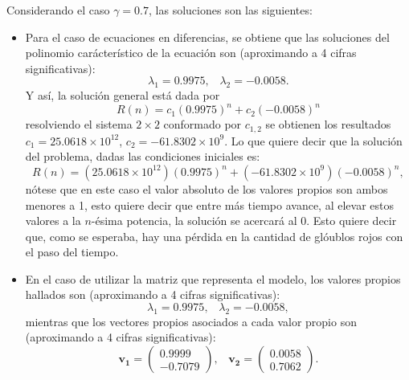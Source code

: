 Considerando el caso $\gamma = 0.7$, las soluciones son las siguientes:
\begin{itemize}
    \item Para el caso de ecuaciones en diferencias, se obtiene que las soluciones del polinomio carácterístico de la ecuación son (aproximando a 4 cifras significativas):
        $$\lambda_1 = 0.9975,\;\;\; \lambda_2 = -0.0058.$$
        Y así, la solución general está dada por 
        $$R(n)=c_1(0.9975)^n+c_2(-0.0058)^n$$
        resolviendo el sistema $2\times 2$ conformado por $c_{1,2}$ se obtienen los resultados $c_1=25.0618\times 10^{12}$, $c_2 = -61.8302\times 10^{9}$. Lo que quiere decir que la solución del problema, dadas las condiciones iniciales es:
        $$R(n)=(25.0618\times 10^{12})(0.9975)^n+(-61.8302\times 10^{9})(-0.0058)^n,$$
        nótese que en este caso el valor absoluto de los valores propios son ambos menores a 1, esto quiere decir que entre más tiempo avance, al elevar estos valores a la $n$-ésima potencia, la solución se acercará al 0. Esto quiere decir que, como se esperaba, hay una pérdida en la cantidad de glóublos rojos con el paso del tiempo.
    \item En el caso de utilizar la matriz que representa el modelo, los valores propios hallados son (aproximando a 4 cifras significativas):
        $$\lambda_1 = 0.9975, \;\;\; \lambda_2 = -0.0058,$$
        mientras que los vectores propios asociados a cada valor propio son (aproximando a 4 cifras significativas):
        $$\mathbf{v_1}=\begin{pmatrix}
            0.9999  \\ 
            -0.7079
            \end{pmatrix},\;\;\;  \mathbf{v_2}=\begin{pmatrix}
            0.0058  \\
            0.7062
            \end{pmatrix}.$$

\end{itemize}

